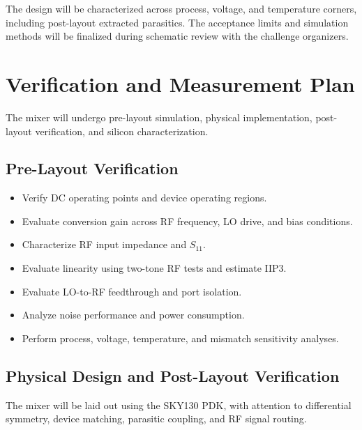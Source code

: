 \documentclass[11pt,letterpaper]{article}
\begin{document}
The design will be characterized across process, voltage,
and temperature corners, including post-layout extracted
parasitics. The acceptance limits and simulation methods
will be finalized during schematic review with the
challenge organizers.


\section{Verification and Measurement Plan}

The mixer will undergo pre-layout simulation, physical
implementation, post-layout verification, and silicon
characterization.

\subsection{Pre-Layout Verification}

\begin{itemize}
    \item Verify DC operating points and device
    operating regions.

    \item Evaluate conversion gain across RF frequency,
    LO drive, and bias conditions.

    \item Characterize RF input impedance and \(S_{11}\).

    \item Evaluate linearity using two-tone RF tests
    and estimate IIP3.

    \item Evaluate LO-to-RF feedthrough and port
    isolation.

    \item Analyze noise performance and power
    consumption.

    \item Perform process, voltage, temperature,
    and mismatch sensitivity analyses.
\end{itemize}


\subsection{Physical Design and Post-Layout Verification}

The mixer will be laid out using the SKY130 PDK, with
attention to differential symmetry, device matching,
parasitic coupling, and RF signal routing.
\end{document}
